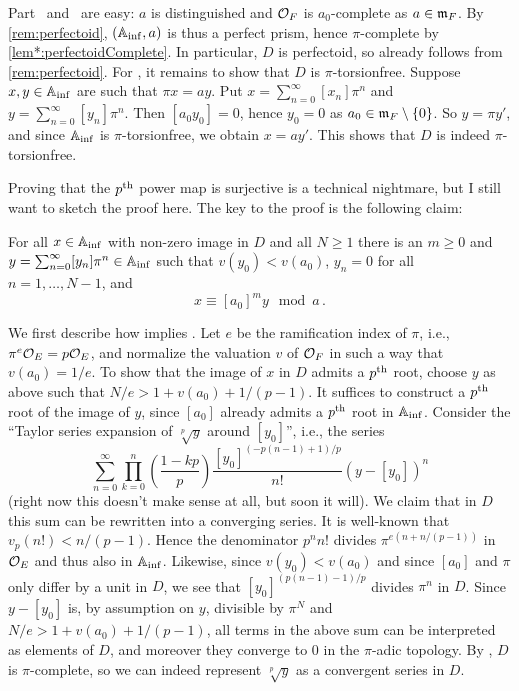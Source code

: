 \documentclass[a4paper, 10pt, oneside, DIV=9, chapterprefix=true, numbers=enddot,bibliography=totoc]{scrbook}
\begin{document}
\begin{proof*}
	Part~ and~ are easy: $a$ is distinguished and $\mathcal{O}_F$ is $a_0$-complete as $a\in\mathfrak{m}_F$. By \cref{rem:perfectoid}, $(\mathbb{A}_{\mathrm{inf}},a)$ is thus a perfect prism, hence $\pi$-complete by \cref{lem*:perfectoidComplete}. In particular, $D$ is perfectoid, so  already follows from \cref{rem:perfectoid}. For , it remains to show that $D$ is $\pi$-torsionfree. Suppose $x,y\in\mathbb{A}_{\mathrm{inf}}$ are such that $\pi x=ay$. Put $x=\sum_{n=0}^\infty[x_n]\pi^n$ and $y=\sum_{n=0}^\infty[y_n]\pi^n$. Then $[a_0y_0]=0$, hence $y_0=0$ as $a_0\in\mathfrak{m}_F\setminus\{0\}$. So $y=\pi y'$, and since $\mathbb{A}_{\mathrm{inf}}$ is $\pi$-torsionfree, we obtain $x=ay'$. This shows that $D$ is indeed $\pi$-torsionfree.
	
	Proving that the $p^{\text{th}}$ power map is surjective is a technical nightmare, but I still want to sketch the proof here. The key to the proof is the following claim:
	\begin{alphanumerate}
		\item[\itememph{*}] For all $x\in\mathbb{A}_{\mathrm{inf}}$ with non-zero image in $D$ and all $N\geq 1$ there is an $m\geq 0$ and $y=\sum_{n=0}^\infty[y_n]\pi^n\in\mathbb{A}_{\mathrm{inf}}$ such that $v(y_0)< v(a_0)$, $y_n=0$ for all $n=1,\dotsc,N-1$, and
		\begin{equation*}
			x\equiv [a_0]^my\mod a\,.
		\end{equation*}
	\end{alphanumerate}
	We first describe how \itememph{*} implies . Let $e$ be the ramification index of $\pi$, i.e., $\pi^e\mathcal{O}_E=p\mathcal{O}_E$, and normalize the valuation $v$ of $\mathcal{O}_F$ in such a way that $v(a_0)=1/e$. To show that the image of $x$ in $D$ admits a $p^{\text{th}}$ root, choose $y$ as above such that $N/e>1+v(a_0)+1/(p-1)$. It suffices to construct a $p^{\text{th}}$ root of the image of $y$, since $[a_0]$ already admits a $p^{\text{th}}$ root in $\mathbb{A}_{\mathrm{inf}}$. Consider the \enquote{Taylor series expansion of $\sqrt[p]{y}$ around $[y_0]$}, i.e., the series
	\begin{equation*}
		\sum_{n=0}^\infty\prod_{k=0}^n\left(\frac{1-kp}{p}\right)\frac{[y_0]^{(-p(n-1)+1)/p}}{n!}(y-[y_0])^n
	\end{equation*}
	(right now this doesn't make sense at all, but soon it will). We claim that in $D$ this sum can be rewritten into a converging series. It is well-known that $v_p(n!)<n/(p-1)$. Hence the denominator $p^nn!$ divides $\pi^{e(n+n/(p-1))}$ in $\mathcal{O}_E$ and thus also in $\mathbb{A}_{\mathrm{inf}}$. Likewise, since $v(y_0)<v(a_0)$ and since $[a_0]$ and $\pi$ only differ by a unit in $D$, we see that $[y_0]^{(p(n-1)-1)/p}$ divides $\pi^{n}$ in $D$. Since $y-[y_0]$ is, by assumption on $y$, divisible by $\pi^N$ and $N/e>1+v(a_0)+1/(p-1)$, all terms in the above sum can be interpreted as elements of $D$, and moreover they converge to $0$ in the $\pi$-adic topology. By , $D$ is $\pi$-complete, so we can indeed represent $\sqrt[p]{y}$ as a convergent series in $D$.
	

\end{proof*}
\end{document}

